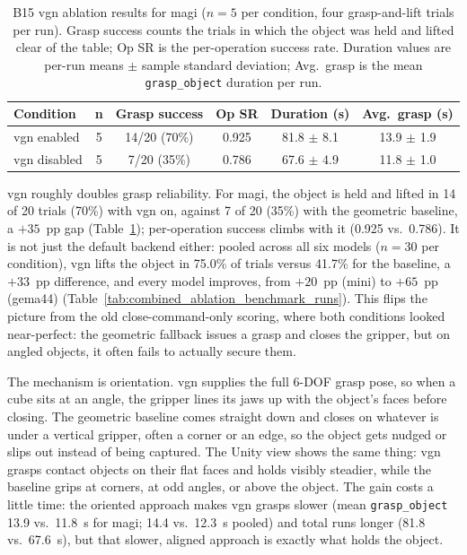 \documentclass[
     12pt,
     a4paper,
     BCOR=10mm,
     DIV=14,
     listof=totoc,
     bibliography=totoc,
     parskip,
     twoside,
     headsepline
     ]{scrreprt}
\begin{document}
\begin{table}[ht]
	\centering
	\begin{tabular}{lccccc}
		\hline
		\textbf{Condition} & \textbf{n}            & \textbf{Grasp success}   &
		\textbf{Op SR}     & \textbf{Duration (s)} & \textbf{Avg.\ grasp (s)}                                           \\
		\hline
		\gls{vgn} enabled  & 5                     & 14/20 (70\%)             & 0.925 & 81.8 $\pm$ 8.1 & 13.9 $\pm$ 1.9 \\
		\gls{vgn} disabled & 5                     & 7/20 (35\%)              & 0.786 & 67.6 $\pm$ 4.9 & 11.8 $\pm$ 1.0 \\
		\hline
	\end{tabular}
	\caption{B15 \gls{vgn} ablation results for \gls{magi} ($n = 5$ per condition, four grasp-and-lift trials per run). Grasp success counts the trials in which the object was held and lifted clear of the table; Op SR is the per-operation success rate. Duration values are per-run means $\pm$ sample standard deviation; Avg.\ grasp is the mean \texttt{grasp\_object} duration per run.}
	\label{tab:b15-results}
\end{table}

\gls{vgn} roughly doubles grasp reliability. For \gls{magi}, the object is held and lifted in 14 of 20 trials (70\%) with \gls{vgn} on, against 7 of 20 (35\%) with the geometric baseline, a $+35$~pp gap (Table~\ref{tab:b15-results}); per-operation success climbs with it (0.925 vs.\ 0.786). It is not just the default backend either: pooled across all six models ($n = 30$ per condition), \gls{vgn} lifts the object in 75.0\% of trials versus 41.7\% for the baseline, a $+33$~pp difference, and every model improves, from $+20$~pp (\gls{mini}) to $+65$~pp (\gls{gema44}) (Table~\ref{tab:combined_ablation_benchmark_runs}). This flips the picture from the old close-command-only scoring, where both conditions looked near-perfect: the geometric fallback issues a grasp and closes the gripper, but on angled objects, it often fails to actually secure them.

The mechanism is orientation. \gls{vgn} supplies the full 6-DOF grasp pose, so when a cube sits at an angle, the gripper lines its jaws up with the object's faces before closing. The geometric baseline comes straight down and closes on whatever is under a vertical gripper, often a corner or an edge, so the object gets nudged or slips out instead of being captured. The Unity view shows the same thing: \gls{vgn} grasps contact objects on their flat faces and holds visibly steadier, while the baseline grips at corners, at odd angles, or above the object. The gain costs a little time: the oriented approach makes \gls{vgn} grasps slower (mean \texttt{grasp\_object} 13.9 vs.\ 11.8~s for \gls{magi}; 14.4 vs.\ 12.3~s pooled) and total runs longer (81.8 vs.\ 67.6~s), but that slower, aligned approach is exactly what holds the object.
\end{document}
